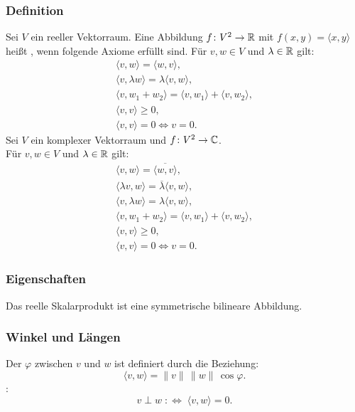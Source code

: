 \subsubsection{Definition}
Sei $V$ ein reeller Vektorraum. Eine Abbildung $f\colon V^2\to\mathbb R$
mit $f(x,y)=\langle x,y\rangle$ heißt , wenn
folgende Axiome erfüllt sind. Für $v,w\in V$ und $\lambda\in\mathbb R$ gilt:
\begin{gather}
\langle v,w\rangle = \langle w,v\rangle,\\
\langle v,\lambda w\rangle = \lambda\langle v,w\rangle,\\
\langle v,w_1+w_2\rangle = \langle v,w_1\rangle +\langle v,w_2\rangle,\\
\langle v,v\rangle\ge 0,\\
\langle v,v\rangle=0 \iff v=0.
\end{gather}
Sei $V$ ein komplexer Vektorraum und $f\colon V^2\to\mathbb C$.\\
Für $v,w\in V$ und $\lambda\in\mathbb R$ gilt:
\begin{gather}
\langle v,w\rangle = \overline{\langle w,v\rangle},\\
\langle \lambda v,w\rangle = \overline{\lambda}\langle v,w\rangle,\\
\langle v,\lambda w\rangle = \lambda\langle v,w\rangle,\\
\langle v,w_1+w_2\rangle = \langle v,w_1\rangle +\langle v,w_2\rangle,\\
\langle v,v\rangle\ge 0,\\
\langle v,v\rangle=0 \iff v=0.
\end{gather}

\subsubsection{Eigenschaften}
Das reelle Skalarprodukt ist eine symmetrische bilineare Abbildung.

\subsubsection{Winkel und Längen}
\begin{definition}\mbox{}\newline
Der  $\varphi$ zwischen $v$ und $w$
ist definiert durch die Beziehung:
\begin{equation}
\langle v,w\rangle = \|v\|\,\|w\|\,\cos\varphi.
\end{equation}
:
\begin{equation}
v\perp w \;:\Longleftrightarrow\; \langle v,w\rangle=0.
\end{equation}
\end{definition}

